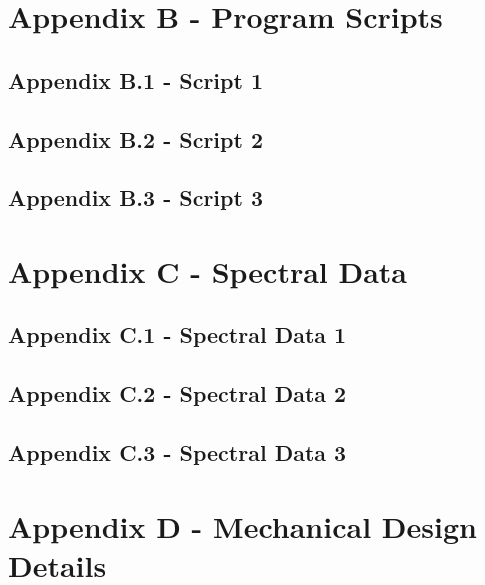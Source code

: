 \documentclass{UoNMCHA}
\numberwithin{equation}{section}
\begin{document}
\newpage
\section{Appendix B - Program Scripts}\label{app:Program Scripts}

\subsection{Appendix B.1 - Script 1}\label{subapp:Script 1}

\subsection{Appendix B.2 - Script 2}\label{subapp:Script 2}

\subsection{Appendix B.3 - Script 3}\label{subapp:Script 3}

\newpage
\section{Appendix C - Spectral Data}\label{app:Spectral Data}

\subsection{Appendix C.1 - Spectral Data 1}\label{subapp:Spectral Data 1}

\subsection{Appendix C.2 - Spectral Data 2}\label{subapp:Spectral Data 2}

\subsection{Appendix C.3 - Spectral Data 3}\label{subapp:Spectral Data 3}

\newpage
\section{Appendix D - Mechanical Design Details}\label{app:Mechanical Design Details}
\end{document}
